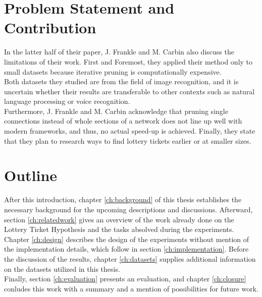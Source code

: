 \section{Problem Statement and Contribution}
In the latter half of their paper, J. Frankle and M. Carbin also discuss the limitations of their work. First and Foremost, they applied their method only to small datasets because iterative pruning is computationally expensive.\cite{LTH}\\
Both datasets they studied are from the field of image recognition, and it is uncertain whether their results are transferable to other contexts such as natural language processing or voice recognition.\\
Furthermore, J. Frankle and M. Carbin acknowledge that pruning single connections instead of whole sections of a network does not line up well with modern frameworks, and thus, no actual speed-up is achieved. Finally, they state that they plan to research ways to find lottery tickets earlier or at smaller sizes.\cite{LTH}


\section{Outline}

After this introduction, chapter \ref{ch:background} of this thesis establishes the necessary background for the upcoming descriptions and discussions. Afterward, section \ref{ch:relatedwork} gives an overview of the work already done on the Lottery Ticket Hypothesis and the tasks absolved during the experiments. Chapter \ref{ch:design} describes the design of the experiments without mention of the implementation details, which follow in section \ref{ch:implementation}. Before the discussion of the results, chapter \ref{ch:datasets} supplies additional information on the datasets utilized in this thesis.\\
Finally, section \ref{ch:evaluation} presents an evaluation, and chapter \ref{ch:closure} conludes this work with a summary and a mention of possibilities for future work.